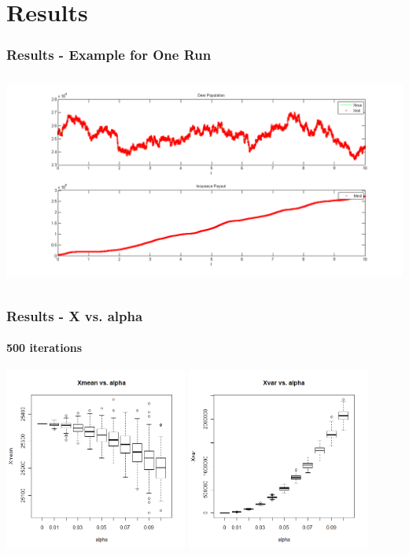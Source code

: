 



\section{Results}

\begin{frame}
    \frametitle{Results - Example for One Run}
\hspace*{-2cm}
\includegraphics[height=7cm]{deerins}
\end{frame}


\begin{frame}
    \frametitle{Results - X vs. alpha }
	\framesubtitle{500 iterations}
\hspace*{-5mm}
\includegraphics[height=6cm]{boxplot500_xmean_alpha}
\includegraphics[height=6cm]{boxplot500_xvar_alpha}
\end{frame}

